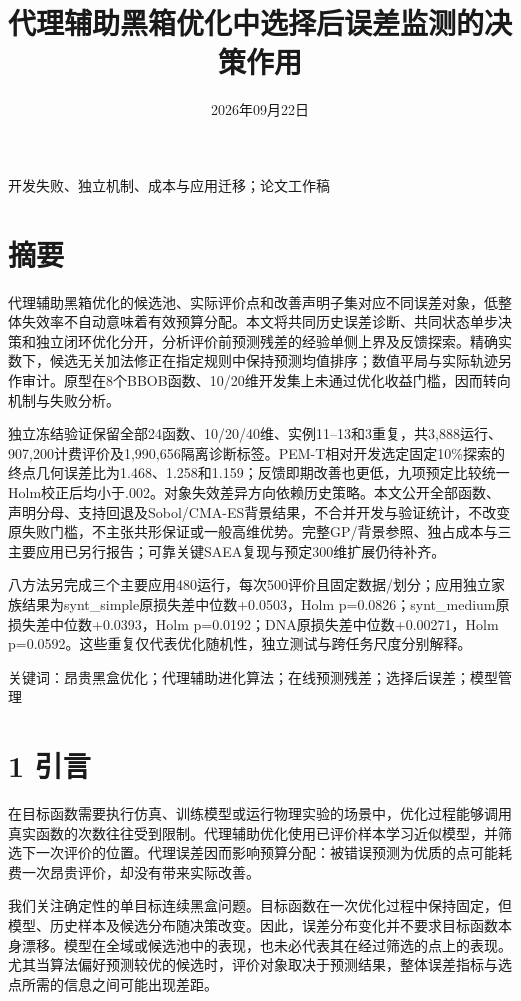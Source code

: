 \documentclass[11pt,a4paper]{article}
\title{代理辅助黑箱优化中选择后误差监测的决策作用}
\author{}
\date{2026年09月22日}
\begin{document}
\maketitle
\begin{center}开发失败、独立机制、成本与应用迁移；论文工作稿\end{center}
\hypertarget{ux6458ux8981}{%
\section{摘要}\label{ux6458ux8981}}

代理辅助黑箱优化的候选池、实际评价点和改善声明子集对应不同误差对象，低整体失效率不自动意味着有效预算分配。本文将共同历史误差诊断、共同状态单步决策和独立闭环优化分开，分析评价前预测残差的经验单侧上界及反馈探索。精确实数下，候选无关加法修正在指定规则中保持预测均值排序；数值平局与实际轨迹另作审计。原型在8个BBOB函数、10/20维开发集上未通过优化收益门槛，因而转向机制与失败分析。

独立冻结验证保留全部24函数、10/20/40维、实例11--13和3重复，共3,888运行、907,200计费评价及1,990,656隔离诊断标签。PEM-T相对开发选定固定10\%探索的终点几何误差比为1.468、1.258和1.159；反馈即期改善也更低，九项预定比较统一Holm校正后均小于.002。对象失效差异方向依赖历史策略。本文公开全部函数、声明分母、支持回退及Sobol/CMA-ES背景结果，不合并开发与验证统计，不改变原失败门槛，不主张共形保证或一般高维优势。完整GP/背景参照、独占成本与三主要应用已另行报告；可靠关键SAEA复现与预定300维扩展仍待补齐。

八方法另完成三个主要应用480运行，每次500评价且固定数据/划分；应用独立家族结果为synt\_simple原损失差中位数+0.0503，Holm
p=0.0826；synt\_medium原损失差中位数+0.0393，Holm
p=0.0192；DNA原损失差中位数+0.00271，Holm
p=0.0592。这些重复仅代表优化随机性，独立测试与跨任务尺度分别解释。

关键词：昂贵黑盒优化；代理辅助进化算法；在线预测残差；选择后误差；模型管理

\hypertarget{ux5f15ux8a00}{%
\section{1 引言}\label{ux5f15ux8a00}}

在目标函数需要执行仿真、训练模型或运行物理实验的场景中，优化过程能够调用真实函数的次数往往受到限制。代理辅助优化使用已评价样本学习近似模型，并筛选下一次评价的位置。代理误差因而影响预算分配：被错误预测为优质的点可能耗费一次昂贵评价，却没有带来实际改善。

我们关注确定性的单目标连续黑盒问题。目标函数在一次优化过程中保持固定，但模型、历史样本及候选分布随决策改变。因此，误差分布变化并不要求目标函数本身漂移。模型在全域或候选池中的表现，也未必代表其在经过筛选的点上的表现。尤其当算法偏好预测较优的候选时，评价对象取决于预测结果，整体误差指标与选点所需的信息之间可能出现差距。
\end{document}
